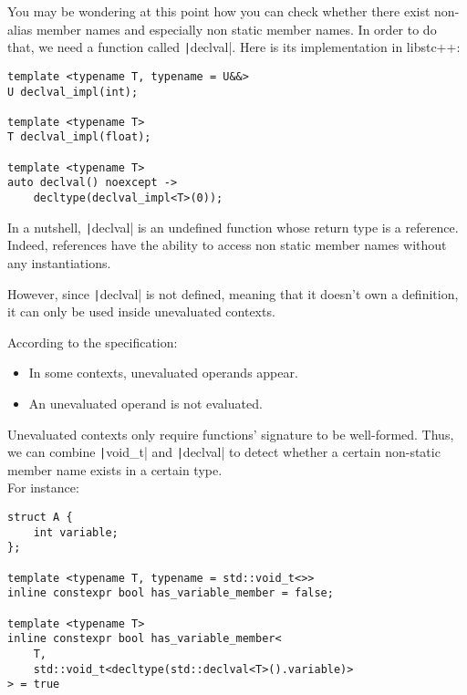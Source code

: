 You may be wondering at this point how you can check whether there exist non-alias member names and especially non static member names. In order to do that, we need a function called \texttt|declval|. Here is its implementation in libstc++:

\begin{paracol}{2}
\begin{verbatim}
template <typename T, typename = U&&>
U declval_impl(int);

template <typename T>
T declval_impl(float);

template <typename T>
auto declval() noexcept -> 
    decltype(declval_impl<T>(0));
\end{verbatim}

\switchcolumn

\vspace{10pt}

In a nutshell, \texttt|declval| is an undefined function whose return type is a reference. Indeed, references have the ability to access non static member names without any instantiations. 
\vspace{10pt}

However, since \texttt|declval| is not defined, meaning that it doesn't own a definition, it can only be used inside unevaluated contexts.
\end{paracol}

According to the specification:
\begin{itemize}
    \item[(1)] In some contexts, unevaluated operands appear. 
    \item[(2)] An unevaluated operand is not evaluated.
\end{itemize}

Unevaluated contexts only require functions' signature to be well-formed. Thus, we can combine \texttt|void_t| and \texttt|declval| to detect whether a certain non-static member name exists in a certain type. \\

For instance:
\begin{verbatim}
struct A {
    int variable;
};

template <typename T, typename = std::void_t<>>
inline constexpr bool has_variable_member = false;

template <typename T>
inline constexpr bool has_variable_member<
    T, 
    std::void_t<decltype(std::declval<T>().variable)>
> = true
\end{verbatim}

